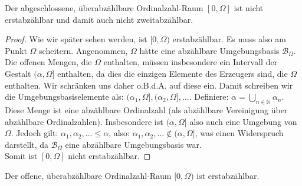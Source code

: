 \documentclass[11pt]{scrartcl}
\begin{document}
\begin{theorem}
	Der abgeschlossene, überabzählbare Ordinalzahl-Raum $[0,\Omega]$ ist nicht erstabzählbar und 
	damit auch nicht zweitabzählbar.
\end{theorem}
\begin{proof}
	Wie wir später sehen werden, ist $[0,\Omega)$ erstabzählbar. Es muss also am Punkt $\Omega$ scheitern.
	Angenommen, $\Omega$ hätte eine abzählbare Umgebungsbasis $\mathcal B_\Omega$. Die offenen Mengen, die $\Omega$
	enthalten, müssen insbesondere ein Intervall der Gestalt $(\alpha, \Omega]$ enthalten, da dies die einzigen 
	Elemente des Erzeugers sind, die $\Omega$ enthalten. Wir schränken uns daher o.B.d.A. auf diese ein. Damit schreiben
	wir die Umgebungsbasiselemente als: $(\alpha_1,\Omega],(\alpha_2, \Omega],...$. Definiere: $\alpha = \bigcup_{n\in\mathbb N} \alpha_n$.
	Diese Menge ist eine abzählbare Ordinalzahl (als abzählbare Vereinigung über abzählbare Ordinalzahlen). Insbesondere ist $(\alpha,\Omega]$ also
	auch eine Umgebung von $\Omega$. Jedoch gilt: $\alpha_1,\alpha_2,...\leq \alpha$, also: $\alpha_1,\alpha_2,...\notin (\alpha,\Omega]$, was
	einen Widerspruch darstellt, da $\mathcal B_\Omega$ eine abzählbare Umgebungsbasis war.\\
	Somit ist $[0,\Omega]$ nicht erstabzählbar.
\end{proof}
\begin{theorem}
	Der offene, überabzählbare Ordinalzahl-Raum $[0,\Omega)$ ist erstabzählbar.
\end{theorem}
\end{document}
